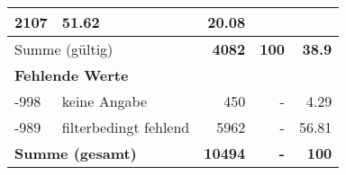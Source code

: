 \begin{longtable}{lXrrr}
       \num{2107} &
       \num[round-mode=places,round-precision=2]{51.62} &
         \num[round-mode=places,round-precision=2]{20.08} \\
     \midrule
     \multicolumn{2}{l}{Summe (gültig)} &
       \textbf{\num{4082}} &
     \textbf{\num{100}} &
       \textbf{\num[round-mode=places,round-precision=2]{38.9}} \\
     \multicolumn{5}{l}{\textbf{Fehlende Werte}}\\
       -998 &
       keine Angabe &
         \num{450} &
        - &
         \num[round-mode=places,round-precision=2]{4.29} \\
       -989 &
       filterbedingt fehlend &
         \num{5962} &
        - &
         \num[round-mode=places,round-precision=2]{56.81} \\
     \midrule
     \multicolumn{2}{l}{\textbf{Summe (gesamt)}} &
          \textbf{\num{10494}} &
        \textbf{-} &
        \textbf{\num{100}} \\
     \bottomrule
     \end{longtable}
     
